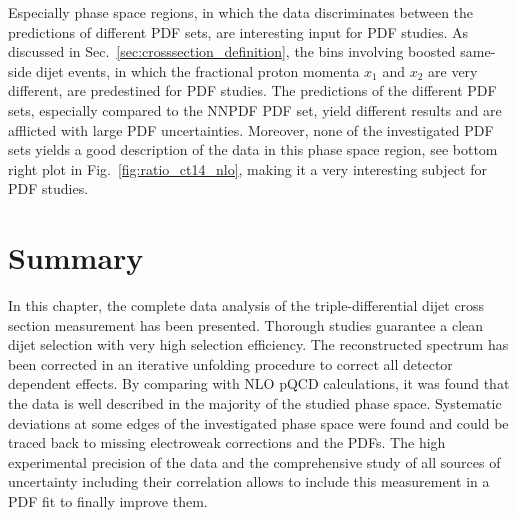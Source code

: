 Especially phase space regions, in which the data discriminates between the
predictions of different PDF sets, are interesting input for PDF studies. As
discussed in Sec.~\ref{sec:crosssection_definition}, the bins involving boosted
same-side dijet events, in which the fractional proton momenta $x_1$ and $x_2$
are very different, are predestined for PDF studies. The predictions of the
different PDF sets, especially compared to the NNPDF PDF set, yield different
results and are afflicted with large PDF uncertainties. Moreover, none of the
investigated PDF sets yields a good description of the data in this phase space
region, see bottom right plot in Fig.~\ref{fig:ratio_ct14_nlo}, making it a very
interesting subject for PDF studies.

\section{Summary}

In this chapter, the complete data analysis of the triple-differential dijet
cross section measurement has been presented. Thorough studies guarantee a clean
dijet selection with very high selection efficiency. The reconstructed spectrum
has been corrected in an iterative unfolding procedure to correct all detector
dependent effects. By comparing with NLO pQCD calculations, it was found that
the data is well described in the majority of the studied phase space.
Systematic deviations at some edges of the investigated phase space were found
and could be traced back to missing electroweak corrections and the PDFs. The
high experimental precision of the data and the comprehensive study of all sources of
uncertainty including their correlation allows to include this measurement in a
PDF fit to finally improve them.

